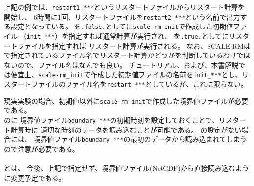 上記の例では、\verb|restart1_***|というリスタートファイルからリスタート計算を開始し、
6時間に1回、リスタートファイルを\verb|restart2_***|という名前で出力する設定となっている。
を\verb|.false.|としてに\verb|scale-rm_init|で作成した初期値ファイル
（\verb|init_***|）を指定すれば通常計算が実行され、
を\verb|.true.|としてにリスタートファイルを指定すれば
リスタート計算が実行される。
なお、SCALE-RMはで指定されているファイル名でリスタート計算かどうかを判断しているわけではないので、ファイル名はなんでも良い。
チュートリアル、および、本書解説では便宜上、\verb|scale-rm_init|で作成した初期値ファイルの名前を\verb|init_***|とし、リスタートファイルのファイル名を\verb|restart_***|としているが、これに限らない。


現実実験の場合、初期値以外に\verb|scale-rm_init|で作成した境界値ファイルが必要である。\\
のに
境界値ファイル\verb|boundary_***|の初期時刻を設定しておくことで、リスタート計算時に
適切な時刻のデータを読み込むことが可能である。
の設定がない場合には、
境界値ファイル\verb|boundary_***|の最初のデータから読み込まれてしまうので注意が必要である。\\

\\

とは、
今後、上記で指定せず、境界値ファイル(NetCDF)から直接読み込むように変更予定である。

